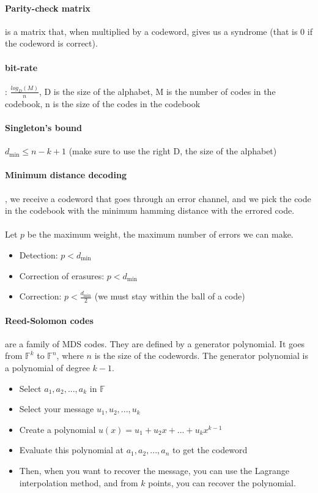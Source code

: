 \documentclass{article}
\begin{document}
\paragraph{Parity-check matrix} is a matrix that, when multiplied by a codeword, gives us a syndrome (that is 0 if the codeword is correct).

\paragraph{bit-rate}: $\frac{log_D(M)}{n}$, D is the size of the alphabet, M is the number of codes in the codebook, n is the size of the codes in the codebook
\paragraph{Singleton's bound} $d_{\text{min}} \leq n - k + 1$ (make sure to use the right D, the size of the alphabet)

\paragraph{Minimum distance decoding}, we receive a codeword that goes through an error channel, and we pick the code in the codebook with the minimum hamming distance with the errored code.\\\\
Let \( p \) be the maximum weight, the maximum number of errors we can make.

\begin{itemize}
    \item Detection: \( p < d_{\text{min}} \)
    \item Correction of erasures: \( p < d_{\text{min}} \)
    \item Correction: \( p < \frac{d_{\text{min}}}{2} \) (we must stay within the ball of a code)
\end{itemize}

\paragraph{Reed-Solomon codes} are a family of MDS codes. They are defined by a generator polynomial. It goes from \( \mathbb{F}^k \) to \( \mathbb{F}^n \), where \( n \) is the size of the codewords. The generator polynomial is a polynomial of degree \( k - 1 \).

\begin{itemize}
    \item Select \( a_1, a_2, ..., a_k \) in \( \mathbb{F} \)
    \item Select your message \( u_1, u_2, ..., u_k \)
    \item Create a polynomial \( u(x) = u_1 + u_2x + ... + u_kx^{k-1} \)
    \item Evaluate this polynomial at \( a_1, a_2, ..., a_n \) to get the codeword
    \item Then, when you want to recover the message, you can use the Lagrange interpolation method, and from \( k \) points, you can recover the polynomial.
\end{itemize}
\end{document}

